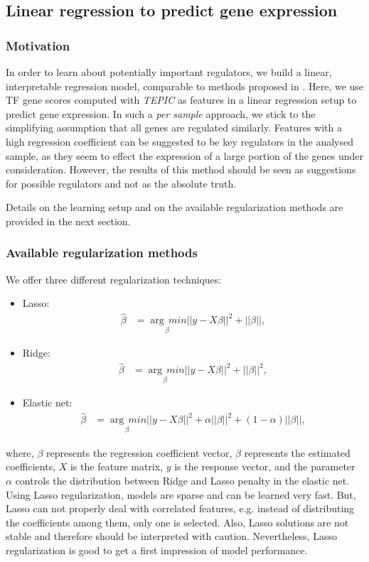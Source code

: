 \documentclass{article}
\begin{document}
\subsection*{Linear regression to predict gene expression}
\subsubsection*{Motivation}
In order to learn about potentially important regulators, we build a linear, interpretable regression model, 
comparable to methods proposed in \cite{pmid27899623,pmid22955983,pmid25231769,pmid22954627}.
Here, we use TF gene scores computed with \textit{TEPIC} as features in a linear regression setup to predict gene expression.
In such a \textit{per sample} approach, we stick to the simplifying assumption that all genes are regulated similarly. 
Features with a high regression coefficient can be suggested to be key regulators in the analysed sample, as they seem to effect the expression
of a large portion of the genes under consideration. However, the results of this method should be seen as suggestions for possible regulators and not as the absolute truth. 

Details on the learning setup and on the available regularization methods are provided in the next section.

\subsubsection*{Available regularization methods}
We offer three different regularization techniques:
\begin{itemize}
\item Lasso:
\begin{align}
 \hat{\beta}&=\underset{\beta}{\arg\,min} ||y-X\beta||^2 + ||\beta||,
\end{align}
\item Ridge:
\begin{align}
 \hat{\beta}&=\underset{\beta}{\arg\,min} ||y-X\beta||^2 + ||\beta||^2,
\end{align}
\item Elastic net:
\begin{align}
 \hat{\beta}&=\underset{\beta}{\arg\,min} ||y-X\beta||^2 + \alpha||\beta||^2 + (1-\alpha)||\beta||,
\end{align}
\end{itemize}
where, $\beta$ represents the regression coefficient vector, $\hat{\beta}$ represents the estimated coefficients, $X$ is the feature matrix, $y$ is the response vector, and
the parameter $\alpha$ controls the distribution between Ridge and Lasso penalty in the elastic net.
\bigskip
\\Using Lasso regularization, models are sparse and can be learned very fast. 
But, Lasso can not properly deal with correlated features, e.g. instead of distributing the coefficients among them, only one is selected. Also, Lasso solutions are not stable and therefore should be interpreted with caution. Nevertheless, Lasso regularization is good to get a first impression of model performance. 
\end{document}
